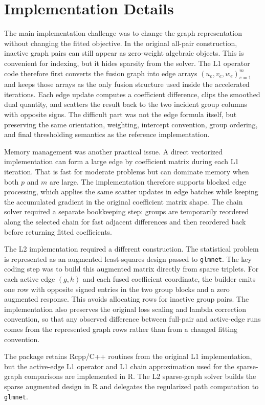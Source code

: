 \documentclass[twoside,11pt]{article}
\begin{document}
\section{Implementation Details}

The main implementation challenge was to change the graph representation
without changing the fitted objective. In the original all-pair construction,
inactive graph pairs can still appear as zero-weight algebraic objects. This
is convenient for indexing, but it hides sparsity from the solver. The L1
operator code therefore first converts the fusion graph into edge arrays
$(u_e,v_e,w_e)_{e=1}^m$ and keeps those arrays as the only fusion structure
used inside the accelerated iterations. Each edge update computes a
coefficient difference, clips the smoothed dual quantity, and scatters the
result back to the two incident group columns with opposite signs. The
difficult part was not the edge formula itself, but preserving the same
orientation, weighting, intercept convention, group ordering, and final
thresholding semantics as the reference implementation.

Memory management was another practical issue. A direct vectorized
implementation can form a large edge by coefficient matrix during each L1
iteration. That is fast for moderate problems but can dominate memory when
both $p$ and $m$ are large. The implementation therefore supports blocked edge
processing, which applies the same scatter updates in edge batches while
keeping the accumulated gradient in the original coefficient matrix shape.
The chain solver required a separate bookkeeping step: groups are temporarily
reordered along the selected chain for fast adjacent differences and then
reordered back before returning fitted coefficients.

The L2 implementation required a different construction. The statistical
problem is represented as an augmented least-squares design passed to
\texttt{glmnet}. The key coding step was to build this augmented matrix
directly from sparse triplets. For each active edge $(g,h)$ and each fused
coefficient coordinate, the builder emits one row with opposite signed entries
in the two group blocks and a zero augmented response. This avoids allocating
rows for inactive group pairs. The implementation also preserves the original
loss scaling and lambda correction convention, so that any observed difference
between full-pair and active-edge runs comes from the represented graph rows
rather than from a changed fitting convention.

The package retains Rcpp/C++ routines from the original L1 implementation, but
the active-edge L1 operator and L1 chain approximation used for the sparse-graph
comparisons are implemented in R. The L2 sparse-graph solver builds the sparse
augmented design in R and delegates the regularized path computation to
\texttt{glmnet}.
\end{document}
